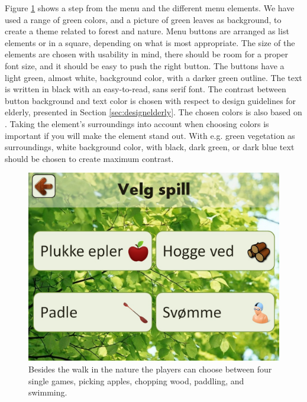 Figure \ref{fig:velgSpill} shows a step from the menu and the different menu elements. We have used a range of green colors, and a picture of green leaves as background, to create a theme related to forest and nature. Menu buttons are arranged as list elements or in a square, depending on what is most appropriate. The size of the elements are chosen with usability in mind, there should be room for a proper font size, and it should be easy to push the right button. The buttons have a light green, almost white, background color, with a darker green outline. The text is written in black with an easy-to-read, sans serif font. The contrast between button background and text color is chosen with respect to design guidelines for elderly, presented in Section \ref{sec:designelderly}. The chosen colors is also based on \cite{blindeforbundetTekst}. Taking the element's surroundings into account when choosing colors is important if you will make the element stand out. With e.g. green vegetation as surroundings, white background color, with black, dark green, or dark blue text should be chosen to create maximum contrast.   

\begin{figure} [H]
\centering
\includegraphics[scale=0.4]{VelgSpill.jpg}
\caption[The four single games]{Besides the walk in the nature the players can choose between four single games, picking apples, chopping wood, paddling, and swimming.}
\label{fig:velgSpill}
\end{figure}

